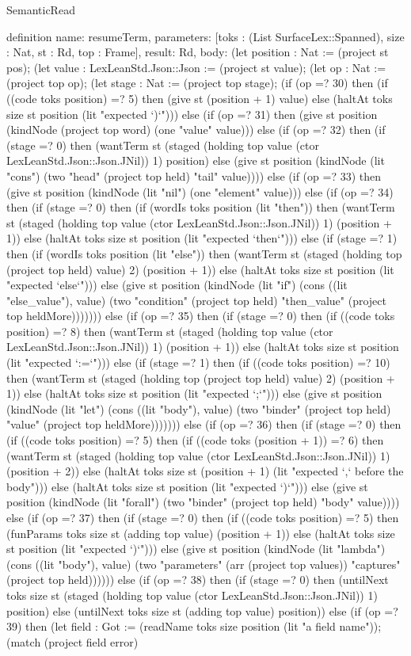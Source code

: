 \begin{lexlean}{SemanticRead}
\begin{semanticmodule}
{definition{
  name: resumeTerm,
  parameters: [toks : (List SurfaceLex::Spanned), size : Nat, st : Rd, top : Frame],
  result: Rd,
  body: (let position : Nat := (project st pos); (let value : LexLeanStd.Json::Json := (project st value); (let op : Nat := (project top op); (let stage : Nat := (project top stage); (if (op =? 30) then (if ((code toks position) =? 5) then (give st (position + 1) value) else (haltAt toks size st position (lit "expected `)`"))) else (if (op =? 31) then (give st position (kindNode (project top word) (one "value" value))) else (if (op =? 32) then (if (stage =? 0) then (wantTerm st (staged (holding top value (ctor LexLeanStd.Json::Json.JNil)) 1) position) else (give st position (kindNode (lit "cons") (two "head" (project top held) "tail" value)))) else (if (op =? 33) then (give st position (kindNode (lit "nil") (one "element" value))) else (if (op =? 34) then (if (stage =? 0) then (if (wordIs toks position (lit "then")) then (wantTerm st (staged (holding top value (ctor LexLeanStd.Json::Json.JNil)) 1) (position + 1)) else (haltAt toks size st position (lit "expected `then`"))) else (if (stage =? 1) then (if (wordIs toks position (lit "else")) then (wantTerm st (staged (holding top (project top held) value) 2) (position + 1)) else (haltAt toks size st position (lit "expected `else`"))) else (give st position (kindNode (lit "if") (cons ((lit "else_value"), value) (two "condition" (project top held) "then_value" (project top heldMore))))))) else (if (op =? 35) then (if (stage =? 0) then (if ((code toks position) =? 8) then (wantTerm st (staged (holding top value (ctor LexLeanStd.Json::Json.JNil)) 1) (position + 1)) else (haltAt toks size st position (lit "expected `:=`"))) else (if (stage =? 1) then (if ((code toks position) =? 10) then (wantTerm st (staged (holding top (project top held) value) 2) (position + 1)) else (haltAt toks size st position (lit "expected `;`"))) else (give st position (kindNode (lit "let") (cons ((lit "body"), value) (two "binder" (project top held) "value" (project top heldMore))))))) else (if (op =? 36) then (if (stage =? 0) then (if ((code toks position) =? 5) then (if ((code toks (position + 1)) =? 6) then (wantTerm st (staged (holding top value (ctor LexLeanStd.Json::Json.JNil)) 1) (position + 2)) else (haltAt toks size st (position + 1) (lit "expected `,` before the body"))) else (haltAt toks size st position (lit "expected `)`"))) else (give st position (kindNode (lit "forall") (two "binder" (project top held) "body" value)))) else (if (op =? 37) then (if (stage =? 0) then (if ((code toks position) =? 5) then (funParams toks size st (adding top value) (position + 1)) else (haltAt toks size st position (lit "expected `)`"))) else (give st position (kindNode (lit "lambda") (cons ((lit "body"), value) (two "parameters" (arr (project top values)) "captures" (project top held)))))) else (if (op =? 38) then (if (stage =? 0) then (untilNext toks size st (staged (holding top value (ctor LexLeanStd.Json::Json.JNil)) 1) position) else (untilNext toks size st (adding top value) position)) else (if (op =? 39) then (let field : Got := (readName toks size position (lit "a field name")); (match (project field error)
}}
\end{semanticmodule}
\end{lexlean}
